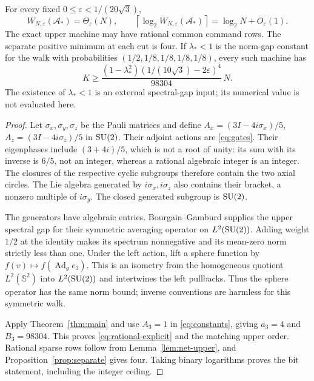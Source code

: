 \begin{theorem}\label{thm:rational}
For every fixed $0\le\varepsilon<1/(20\sqrt3)$,
\begin{equation}\label{eq:rational-rate}
 W_{N,\varepsilon}(\mathcal A_*)=\Theta_\varepsilon(N),\qquad
 \left\lceil\log_2 W_{N,\varepsilon}(\mathcal A_*)\right\rceil
                =\log_2N+O_\varepsilon(1).
\end{equation}
The exact upper machine may have rational common command rows.
The separate positive minimum at each cut is four. If $\lambda_*<1$
is the norm-gap constant for the walk with probabilities
$(1/2,1/8,1/8,1/8,1/8)$, every such machine has
\begin{equation}\label{eq:rational-explicit}
 K\ge\frac{(1-\lambda_*^2)
                (1/(10\sqrt3)-2\varepsilon)^4}{98304}\,N.
\end{equation}
The existence of $\lambda_*<1$ is an external spectral-gap input; its
numerical value is not evaluated here.
\end{theorem}
\begin{proof}
Let $\sigma_x,\sigma_y,\sigma_z$ be the Pauli matrices and define
$A_x=(3I-4i\sigma_x)/5$, $A_z=(3I-4i\sigma_z)/5$ in $\operatorname{SU}(2)$.
Their adjoint actions are \eqref{eq:gates}. Their eigenphases include
$(3+4i)/5$, which is not a root of unity: its sum with its inverse is
$6/5$, not an integer, whereas a rational algebraic integer is an integer.
The closures of the respective cyclic subgroups therefore contain the
two axial circles. The Lie algebra generated by $i\sigma_x,i\sigma_z$
also contains their bracket, a nonzero multiple of $i\sigma_y$.
The closed generated subgroup is $\operatorname{SU}(2)$.

The generators have algebraic entries. Bourgain--Gamburd
\cite[Theorem 1]{BG12} supplies the upper spectral gap for their symmetric
averaging operator on $L^2(\operatorname{SU}(2))$. Adding weight $1/2$ at the identity
makes its spectrum nonnegative and its mean-zero norm strictly less than
one. Under the left action, lift a sphere function by
$f(v)\mapsto f(\operatorname{Ad}_g e_3)$. This is an isometry from the
homogeneous quotient $L^2(\mathbb S^2)$ into $L^2(\operatorname{SU}(2))$ and
intertwines the left pullbacks. Thus the sphere operator has the same
norm bound; inverse conventions are harmless for this symmetric walk.

Apply Theorem~\ref{thm:main} and use $A_3=1$ in
\eqref{eq:constants}, giving $a_3=4$ and $B_3=98304$.
This proves \eqref{eq:rational-explicit} and the matching upper order.
Rational sparse rows follow from Lemma~\ref{lem:net-upper}, and
Proposition~\ref{prop:separate} gives four. Taking binary logarithms
proves the bit statement, including the integer ceiling.
\end{proof}

